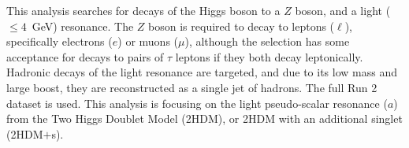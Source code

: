 \documentclass[NOTE, atlasdraft=true, texlive=2017, UKenglish]{\ATLASLATEXPATH atlasdoc}
\begin{document}
This analysis searches for decays of the Higgs boson to a $Z$ boson, and a light ($\leq 4$~GeV) resonance. The $Z$ boson is required to decay to leptons ($\ell$), specifically electrons ($e$) or muons ($\mu$), although the selection has some acceptance for decays to pairs of $\tau$ leptons if they both decay leptonically. Hadronic decays of the light resonance are targeted, and due to its low mass and large boost, they are reconstructed as a single jet of hadrons. The full Run 2 dataset is used. This analysis is focusing on the light pseudo-scalar resonance ($a$) from the Two Higgs Doublet Model (2HDM), or 2HDM with an additional singlet (2HDM$+$s).


\end{document}
